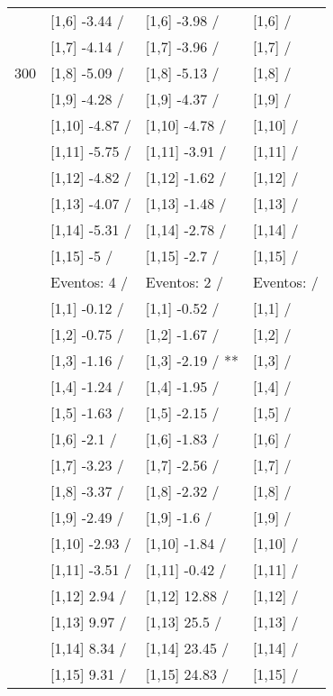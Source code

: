 \begin{table}
\begin{tabular}[t]{llll}
 & {}[1,6] -3.44  / & {}[1,6] -3.98  / & {}[1,6]  /\\
 & {}[1,7] -4.14  / & {}[1,7] -3.96  / & {}[1,7]  /\\
300 & {}[1,8] -5.09  / & {}[1,8] -5.13  / & {}[1,8]  /\\
\addlinespace
 & {}[1,9] -4.28  / & {}[1,9] -4.37  / & {}[1,9]  /\\
 & {}[1,10] -4.87  / & {}[1,10] -4.78  / & {}[1,10]  /\\
 & {}[1,11] -5.75  / & {}[1,11] -3.91  / & {}[1,11]  /\\
 & {}[1,12] -4.82  / & {}[1,12] -1.62  / & {}[1,12]  /\\
 & {}[1,13] -4.07  / & {}[1,13] -1.48  / & {}[1,13]  /\\
\addlinespace
 & {}[1,14] -5.31  / & {}[1,14] -2.78  / & {}[1,14]  /\\
 & {}[1,15] -5  / & {}[1,15] -2.7  / & {}[1,15]  /\\
 & Eventos:  4 / & Eventos:  2 / & Eventos:   /\\
 & {}[1,1] -0.12  / & {}[1,1] -0.52  / & {}[1,1]  /\\
 & {}[1,2] -0.75  / & {}[1,2] -1.67  / & {}[1,2]  /\\
\addlinespace
 & {}[1,3] -1.16  / & {}[1,3] -2.19  / ** & {}[1,3]  /\\
 & {}[1,4] -1.24  / & {}[1,4] -1.95  / & {}[1,4]  /\\
 & {}[1,5] -1.63  / & {}[1,5] -2.15  / & {}[1,5]  /\\
 & {}[1,6] -2.1  / & {}[1,6] -1.83  / & {}[1,6]  /\\
 & {}[1,7] -3.23  / & {}[1,7] -2.56  / & {}[1,7]  /\\
\addlinespace
500 & {}[1,8] -3.37  / & {}[1,8] -2.32  / & {}[1,8]  /\\
 & {}[1,9] -2.49  / & {}[1,9] -1.6  / & {}[1,9]  /\\
 & {}[1,10] -2.93  / & {}[1,10] -1.84  / & {}[1,10]  /\\
 & {}[1,11] -3.51  / & {}[1,11] -0.42  / & {}[1,11]  /\\
 & {}[1,12] 2.94  / & {}[1,12] 12.88  / & {}[1,12]  /\\
\addlinespace
 & {}[1,13] 9.97  / & {}[1,13] 25.5  / & {}[1,13]  /\\
 & {}[1,14] 8.34  / & {}[1,14] 23.45  / & {}[1,14]  /\\
 & {}[1,15] 9.31  / & {}[1,15] 24.83  / & {}[1,15]  /\\
\bottomrule
\end{tabular}
\end{table}
